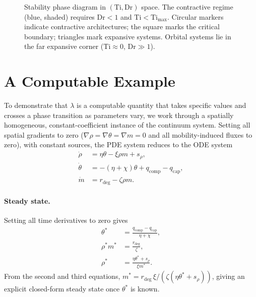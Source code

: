 \documentclass[10pt,twocolumn]{article}
\theoremstyle{plain}
\theoremstyle{definition}
\theoremstyle{remark}
\begin{document}
\begin{figure}[t]
\caption{Stability phase diagram in $(\mathrm{Ti}, \mathrm{Dr})$ space.
The contractive regime (blue, shaded) requires $\mathrm{Dr} < 1$ and
$\mathrm{Ti} < \mathrm{Ti}_{\max}$. Circular markers indicate
contractive architectures; the square marks the critical boundary;
triangles mark expansive systems. Orbital systems lie in the far
expansive corner ($\mathrm{Ti} \approx 0$, $\mathrm{Dr} \gg 1$).}
\label{fig:phase_diagram}
\end{figure}

\section{A Computable Example}
\label{sec:example}

To demonstrate that $\lambda$ is a computable quantity that takes
specific values and crosses a phase transition as parameters vary, we
work through a spatially homogeneous, constant-coefficient instance of
the continuum system. Setting all spatial gradients to zero
($\nabla\rho = \nabla\theta = \nabla m = 0$ and all mobility-induced
fluxes to zero), with constant sources, the PDE system reduces to the
ODE system
\begin{align*}
  \dot\rho &= \eta\theta - \xi\rho m + s_\rho, \\
  \dot\theta &= -(\eta+\chi)\theta + q_{\mathrm{comp}} - q_{\mathrm{cap}}, \\
  \dot m &= r_{\mathrm{deg}} - \zeta\rho m.
\end{align*}

\paragraph{Steady state.} Setting all time derivatives to zero gives
\begin{align*}
  \theta^* &= \frac{q_{\mathrm{comp}} - q_{\mathrm{cap}}}{\eta+\chi}, \\
  \rho^*m^* &= \frac{r_{\mathrm{deg}}}{\zeta}, \\
  \rho^* &= \frac{\eta\theta^* + s_\rho}{\xi m^*}.
\end{align*}
From the second and third equations,
$m^* = r_{\mathrm{deg}}\,\xi / (\zeta(\eta\theta^*+s_\rho))$, giving an
explicit closed-form steady state once $\theta^*$ is known.
\end{document}

